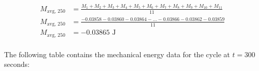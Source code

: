 \documentclass{article}
\begin{document}
            \begin{equation}
                \begin{aligned}
                    M_{\text{avg, 250}} &= \frac{M_1 + M_2 + M_3 + M_4 + M_5 + M_6 + M_7 + M_8 + M_9 + M_{10} + M_{11}}{11} \\
                    M_{\text{avg, 250}} &= \frac{-0.03858 -0.03860 -0.03864 -  \ldots -0.03866 -0.03862 -0.03859}{11} \\
                    M_{\text{avg, 250}} &= -0.03865 \text{ J} \\
                \end{aligned}\label{eq:average-mechanical-energy-cycle-at-250-seconds}
            \end{equation}
            
            The following table contains the mechanical energy data for the cycle at $t=300$ seconds:
            
\end{document}
